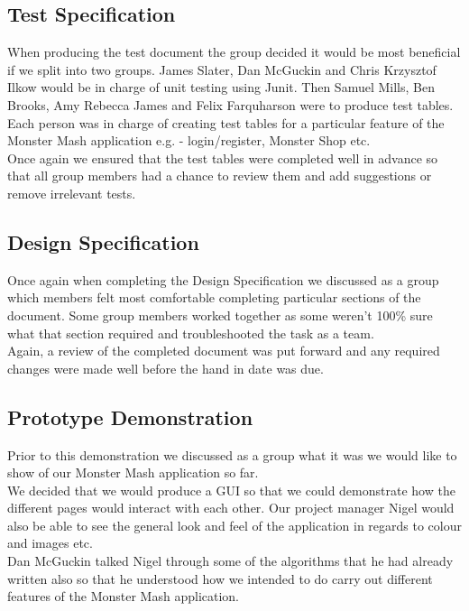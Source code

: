 \documentclass[titlepage]{article}
\begin{document}
{\subsection{Test Specification}
When producing the test document the group decided it would be most beneficial if we split into two groups. James Slater, Dan McGuckin and Chris Krzysztof Ilkow would be in charge of unit testing using Junit. Then Samuel Mills, Ben Brooks, Amy Rebecca James and Felix Farquharson were to produce test tables. Each person was in charge of creating test tables for a particular feature of the Monster Mash application e.g. - login/register, Monster Shop etc.\\
Once again we ensured that the test tables were completed well in advance so that all group members had a chance to review them and add suggestions or remove irrelevant tests.
\subsection{Design Specification}
Once again when completing the Design Specification we discussed as a group which members felt most comfortable completing particular sections of the document. Some group members worked together as some weren't 100\% sure what that section required and troubleshooted the task as a team. \\
Again, a review of the completed document was put forward and any required changes were made well before the hand in date was due.
\subsection{Prototype Demonstration}
Prior to this demonstration we discussed as a group what it was we would like to show of our Monster Mash application so far. \\
We decided that we would produce a GUI so that we could demonstrate how the different pages would interact with each other. Our project manager Nigel would also be able to see the general look and feel of the application in regards to colour and images etc.\\
Dan McGuckin talked Nigel through some of the algorithms that he had already written also so that he understood how we intended to do carry out different features of the Monster Mash application.
}
\end{document}
